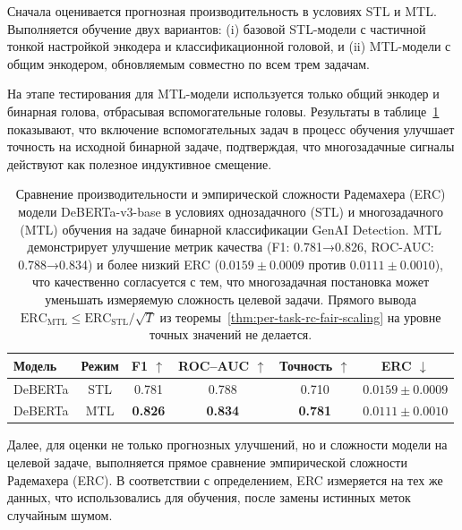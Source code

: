 Сначала оценивается прогнозная производительность в условиях STL и MTL.
Выполняется обучение двух вариантов: (i) базовой STL-модели с частичной тонкой настройкой энкодера и классификационной головой, и (ii) MTL-модели с общим энкодером, обновляемым совместно по всем трем задачам.

На этапе тестирования для MTL-модели используется только общий энкодер и бинарная голова, отбрасывая вспомогательные головы.
Результаты в таблице~\ref{tab:stl-mtl-performance-erc} показывают, что включение вспомогательных задач в процесс обучения улучшает точность на исходной бинарной задаче, подтверждая, что многозадачные сигналы действуют как полезное индуктивное смещение.

\begin{table}[t]
    \caption{Сравнение производительности и эмпирической сложности Радемахера (ERC) модели DeBERTa-v3-base в условиях однозадачного (STL) и многозадачного (MTL) обучения на задаче бинарной классификации GenAI Detection. MTL демонстрирует улучшение метрик качества (F1: 0.781→0.826, ROC-AUC: 0.788→0.834) и более низкий ERC ($0.0159 \pm 0.0009$ против $0.0111 \pm 0.0010$), что качественно согласуется с тем, что многозадачная постановка может уменьшать измеряемую сложность целевой задачи. Прямого вывода $\mathrm{ERC_{MTL}}\le \mathrm{ERC_{STL}}/\sqrt{T}$ из теоремы~\ref{thm:per-task-rc-fair-scaling} на уровне точных значений не делается.}
    \label{tab:stl-mtl-performance-erc}
    \begin{center}
    \begin{tabular}{@{}lccccc@{}}
    \toprule
    Модель & Режим & F1 $\uparrow$ & ROC--AUC $\uparrow$ & Точность $\uparrow$ & ERC $\downarrow$ \\
    \midrule
    DeBERTa & STL & 0.781 & 0.788 & 0.710 & $0.0159 \pm 0.0009$ \\
    DeBERTa & MTL & \textbf{0.826} & \textbf{0.834} & \textbf{0.781} & $\mathbf{0.0111} \pm \mathbf{0.0010}$ \\
    \bottomrule
    \end{tabular}
    \end{center}
\end{table}

Далее, для оценки не только прогнозных улучшений, но и сложности модели на целевой задаче, выполняется прямое сравнение эмпирической сложности Радемахера (ERC).
В соответствии с определением, ERC измеряется на тех же данных, что использовались для обучения, после замены истинных меток случайным шумом.

